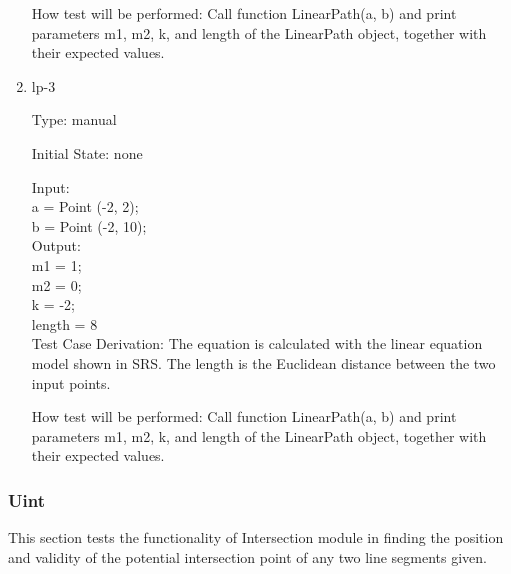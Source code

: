 \documentclass[12pt, titlepage]{article}
\begin{document}
\begin{enumerate}
How test will be performed: Call function LinearPath(a, b) and print parameters m1, m2, k, and  length of the LinearPath object, together with their expected values.

\item{lp-3\\}

Type: manual
					
Initial State: none
					
Input: \\
a = Point (-2, 2);\\
b = Point (-2, 10);\\
					
Output: \\
m1 = 1;\\
m2 = 0;\\
k = -2;\\
length = 8\\

Test Case Derivation: The equation is calculated with the linear equation model shown in SRS. The length is the Euclidean distance between the two input points.

How test will be performed: Call function LinearPath(a, b) and print parameters m1, m2, k, and  length of the LinearPath object, together with their expected values.
    
\end{enumerate}

\subsubsection{Uint}
\label{intersection}

This section tests the functionality of Intersection module in finding the position and validity of the potential intersection point of any two line segments given.
\end{document}
